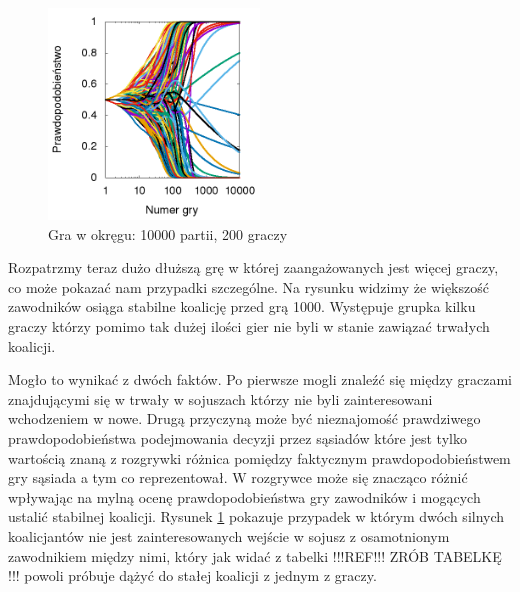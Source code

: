 \begin{figure}
    \centering
    \includegraphics[width=0.5\textwidth]{pict/wyniki/g10000p200}   
    \caption{Gra w okręgu: 10000 partii, 200 graczy}
	\label{fig:niechciani} 
\end{figure}

Rozpatrzmy teraz dużo dłuższą grę w której zaangażowanych jest więcej graczy, co może pokazać nam przypadki szczególne. Na rysunku widzimy że większość zawodników osiąga stabilne koalicję przed grą 1000. Występuje grupka kilku graczy którzy pomimo tak dużej ilości gier nie byli w stanie zawiązać trwałych koalicji.

Mogło to wynikać z dwóch faktów. Po pierwsze mogli znaleźć się między graczami znajdującymi się w trwały w sojuszach którzy nie byli zainteresowani wchodzeniem w nowe. Drugą przyczyną może być nieznajomość prawdziwego prawdopodobieństwa podejmowania decyzji przez sąsiadów które jest tylko wartością znaną z rozgrywki różnica pomiędzy faktycznym prawdopodobieństwem gry sąsiada a tym co reprezentował. W rozgrywce może się znacząco różnić wpływając na mylną ocenę prawdopodobieństwa gry zawodników i mogących ustalić stabilnej koalicji. Rysunek \ref{fig:niechciani} pokazuje przypadek w którym dwóch silnych koalicjantów nie jest zainteresowanych wejście w sojusz z osamotnionym zawodnikiem między nimi, który jak widać z tabelki !!!REF!!! ZRÓB TABELKĘ !!! powoli próbuje dążyć do stałej koalicji z jednym z graczy.  

